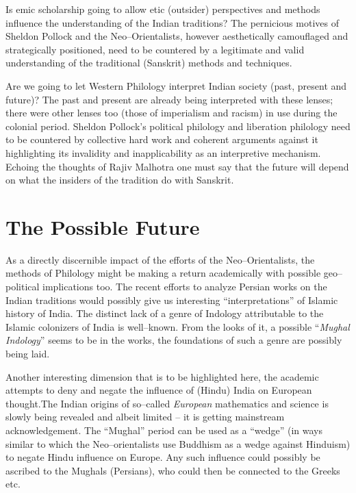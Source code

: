 \vskip -7pt

Is emic scholarship going to allow etic (outsider) perspectives and methods influence the understanding of the Indian traditions? The pernicious motives of Sheldon Pollock and the Neo–Orientalists, however aesthetically camouflaged and strategically positioned, need to be countered by a legitimate and valid understanding of the traditional (Sanskrit) methods and techniques.

Are we going to let Western Philology interpret Indian society (past, present and future)? The past and present are already being interpreted with these lenses; there were other lenses too (those of imperialism and racism) in use during the colonial period. Sheldon Pollock’s political philology and liberation philology need to be countered by collective hard work and coherent arguments against it highlighting its invalidity and inapplicability as an interpretive mechanism. Echoing the thoughts of Rajiv Malhotra one must say that the future will depend on what the insiders of the tradition do with Sanskrit.

\vskip -6pt


\section*{The Possible Future}

\vskip -6pt

As a directly discernible impact of the efforts of the Neo–Orientalists, the methods of Philology might be making a return academically with possible geo–political implications too. The recent efforts to analyze Persian works on the Indian traditions would possibly give us interesting “interpretations” of Islamic history of India. The distinct lack of a genre of Indology attributable to the Islamic colonizers of India is well–known. From the looks of it, a possible “\textit{Mughal Indology}” seems to be in the works, the foundations of such a genre are possibly being laid.

Another interesting dimension that is to be highlighted here, the academic attempts to deny and negate the influence of (Hindu) India on European thought.The Indian origins of so–called \textit{European} mathematics and science is slowly being revealed and albeit limited – it is getting mainstream acknowledgement. The “Mughal” period can be used as a “wedge” (in ways similar to which the Neo–orientalists use Buddhism as a wedge against Hinduism) to negate Hindu influence on Europe. Any such influence could possibly be ascribed to the Mughals (Persians), who could then be connected to the Greeks etc.

